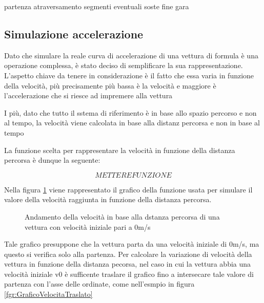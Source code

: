 \documentclass[a4paper,11pt, twoside]{book}
\begin{document}
	    
	    
	  partenza 
	  atraversamento segmenti
	  eventuali soste
	  fine gara
      \subsection{Simulazione accelerazione}
	Dato che simulare la reale curva di accelerazione di una vettura di formula è una operazione complessa,
	è stato deciso di semplificare la sua rappresentazione.
	L'aspetto chiave da tenere in considerazione è il fatto che essa varia in funzione della velocità, più precisamente
	più bassa è la velocità e maggiore è l'accelerazione che si riesce ad impremere alla vettura
	
	I più, dato che tutto il sstema di riferimento è in base allo spazio percorso e non al tempo, la velocità
	viene calcolata in base alla distanz percorsa e non in base al tempo
	
	La funzione scelta per rappresentare la velocità in funzione della distanza percorsa è 
	dunque la seguente:
	
	$$METTERE FUNZIONE$$
	
	Nella figura \ref{fgr:GraficoVelocita} viene rappresentato il grafico della funzione usata per simulare il valore
	della velocità raggiunta in funzione della distanza percorsa.
	
	\begin{figure}[h]
	  \centering
	  \caption{Andamento della velocità in base alla dstanza percorsa di una vettura con velocità iniziale
		    pari a 0m/s}
	  \label{fgr:GraficoVelocita}
	\end{figure}
	
	Tale grafico presuppone che la vettura parta da una velocità iniziale di 0m/s, ma questo si verifica solo 
	alla partenza.
	Per calcolare la variazione di velocità della vettura in funzione della distanza pecorsa, nel caso in cui la vettura
	abbia una velocità iniziale v0 è sufficente traslare il grafico fino a intersecare tale valore di partenza con l'asse
	delle ordinate, come nell'esmpio in figura \ref{fgr:GraficoVelocitaTraslato}
	
\end{document}
